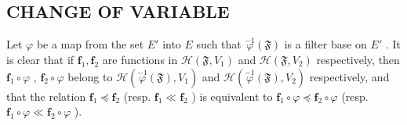 \subsection{CHANGE OF VARIABLE}

Let \(\varphi\) be a map from the set \(E'\) into \(E\) such that \(\overset{-1}{\varphi}(\mathfrak{F})\) is a filter base on \(E'\) . It is clear that if \(\mathbf{f}_1, \mathbf{f}_2\) are functions in \(\mathcal{H}(\mathfrak{F}, V_1)\) and \(\mathcal{H}(\mathfrak{F}, V_2)\) respectively, then \(\mathbf{f}_1 \circ \varphi\) , \(\mathbf{f}_2 \circ \varphi\) belong to \(\mathcal{H}(\overset{-1}{\varphi}(\mathfrak{F}), V_1)\) and \(\mathcal{H}(\overset{-1}{\varphi}(\mathfrak{F}), V_2)\) respectively, and that the relation \(\mathbf{f}_1 \preccurlyeq \mathbf{f}_2\) (resp. \(\mathbf{f}_1 \ll \mathbf{f}_2\) ) is equivalent to \(\mathbf{f}_1 \circ \varphi \preccurlyeq \mathbf{f}_2 \circ \varphi\) (resp. \(\mathbf{f}_1 \circ \varphi \ll \mathbf{f}_2 \circ \varphi\) ).

